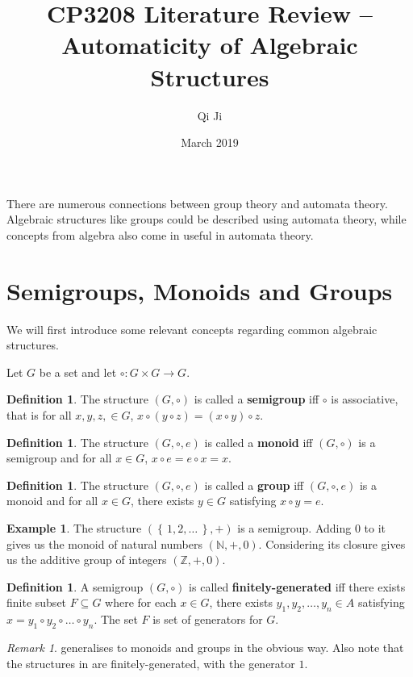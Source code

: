 \documentclass[british,a4paper,]{scrartcl}
\title{CP3208 Literature Review -- Automaticity of Algebraic Structures}
\author{Qi Ji}
\date{March 2019}
\theoremstyle{definition}
\newtheorem{definition}[theorem]{Definition}
\newtheorem{example}[theorem]{Example}
\theoremstyle{remark}
\newtheorem*{remark}{Remark}
\newcommand{\set}[1]{\left\{\, #1 \,\right\}}
\newcommand{\N}{\mathbb{N}}
\newcommand{\Z}{\mathbb{Z}}
\begin{document}
\maketitle

There are numerous connections between group theory and automata theory.
Algebraic structures like groups could be described using automata theory, while
concepts from algebra also come in useful in automata theory.

\section{Semigroups, Monoids and Groups}

We will first introduce some relevant concepts regarding common algebraic structures.

Let \(G\) be a set and let \(\circ : G\times G \to G\).
\begin{definition}
    The structure \((G,\circ)\) is called a \textbf{semigroup} iff \(\circ\) is associative,
    that is for all \(x,y,z,\in G\), \(x\circ(y\circ z) = (x\circ y)\circ z\).
\end{definition}
\begin{definition}
    The structure \((G, \circ, e)\) is called a \textbf{monoid} iff \((G, \circ)\) is a semigroup
    and for all \(x\in G\), \(x\circ e = e \circ x = x\).
\end{definition}
\begin{definition}
    The structure \((G, \circ, e)\) is called a \textbf{group} iff \((G, \circ, e)\) is a monoid
    and for all \(x\in G\), there exists \(y \in G\) satisfying \(x\circ y = e\).
\end{definition}
\begin{example} \label{example:integers}
    The structure \((\set{1,2,\dots}, +)\) is a semigroup.
    Adding \(0\) to it gives us the monoid of natural numbers \((\N, +, 0)\).
    Considering its closure gives us the additive group of integers \((\Z, +, 0)\).
\end{example}
\begin{definition} \label{def:finitelygenerated}
    A semigroup \((G, \circ)\) is called \textbf{finitely-generated} iff
    there exists finite subset \(F \subseteq G\) where
    for each \(x \in G\), there exists \(y_1, y_2,\dots, y_n\in A\) satisfying
    \(x = y_1\circ y_2 \circ \dots \circ y_n\).
    The set \(F\) is set of generators for \(G\).
\end{definition}

\begin{remark}
     generalises to monoids and groups in the obvious way.
    Also note that the structures in  are finitely-generated,
    with the generator \(1\).
\end{remark}
\end{document}
